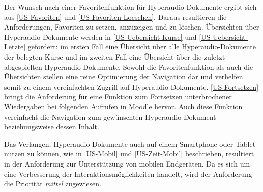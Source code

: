Der Wunsch nach einer Favoritenfunktion für Hyperaudio-Dokumente ergibt sich aus \ref{US-Favoriten} und \ref{US-Favoriten-Loeschen}. Daraus resultieren die Anforderungen, Favoriten zu setzen, anzuzeigen und zu löschen. Übersichten über Hyperaudio-Dokumente werden in \ref{US-Uebersicht-Kurse} und \ref{US-Uebersicht-Letzte} gefordert: im ersten Fall eine Übersicht über alle Hyperaudio-Dokumente der belegten Kurse und im zweiten Fall eine Übersicht über die zuletzt abgespielten Hyperaudio-Dokumente. Sowohl die Favoritenfunktion als auch die Übersichten stellen eine reine Optimierung der Navigation dar und verhelfen somit zu einem vereinfachten Zugriff auf Hyperaudio-Dokumente. \ref{US-Fortsetzen} bringt die Anforderung für eine Funktion zum Fortsetzen unterbrochener Wiedergaben bei folgenden Aufrufen in Moodle hervor. Auch diese Funktion vereinfacht die Navigation zum gewünschten Hyperaudio-Dokument beziehungsweise dessen Inhalt.

Das Verlangen, Hyperaudio-Dokumente auch auf einem Smartphone oder Tablet nutzen zu können, wie in \ref{US-Mobil} und \ref{US-Zeit-Mobil} beschrieben, resultiert in der Anforderung zur Unterstützung von mobilen Endgeräten. Da es sich um eine Verbesserung der Interaktionsmöglichkeiten handelt, wird der Anforderung die Priorität \textit{mittel} zugewiesen.


